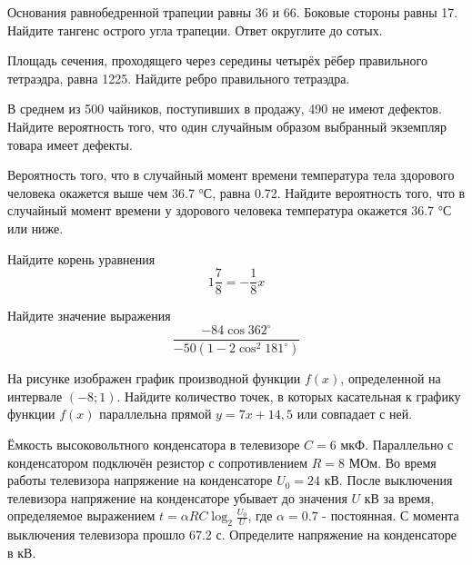 \documentclass[twocolumn]{article}
\begin{document}
\cleardoublepage
\def\examvart{Вариант 18.1}
\normalsize

\startpartone
\large




\begin{taskBN}{1}
Основания равнобедренной трапеции равны 36 и 66. Боковые стороны равны 17. Найдите тангенс острого угла трапеции. Ответ округлите до сотых.
\end{taskBN}

\begin{taskBN}{2}
Площадь сечения, проходящего через середины четырёх рёбер правильного тетраэдра, равна 1225. Найдите ребро правильного тетраэдра.
\end{taskBN}

\begin{taskBN}{3}
В среднем из 500 чайников, поступивших в продажу, 490 не имеют дефектов. Найдите вероятность того, что один случайным образом выбранный экземпляр товара имеет дефекты.
\end{taskBN}

\begin{taskBN}{4}
Вероятность того, что в случайный момент времени температура тела здорового человека окажется выше чем 36.7 °С, равна 0.72. Найдите вероятность того, что в случайный момент времени у здорового человека температура окажется 36.7 °С или ниже.
\end{taskBN}

\begin{taskBN}{5}
Найдите корень уравнения $${1}\frac{7}{8}=-\frac{1}{8}x$$
\end{taskBN}

\begin{taskBN}{6}
Найдите значение выражения $$\frac{-84\cos362^\circ}{-50(1-2\cos^2{181^\circ})}$$
\end{taskBN}

\begin{taskBN}{7}
На рисунке изображен график производной функции $f(x)$, определенной на интервале $(-8; 1)$. Найдите количество точек, в которых касательная к графику функции $f(x)$ параллельна прямой $y=7x+ 14{,}5 $ или совпадает с ней.\vspace{2.5cm}
\end{taskBN}

\begin{taskBN}{8}
Ёмкость высоковольтного конденсатора в телевизоре $C=6$ мкФ. Параллельно с конденсатором подключён резистор с сопротивлением $R=8$ МОм. Во время работы телевизора напряжение на конденсаторе $U_{0}=24$ кВ. После выключения телевизора напряжение на конденсаторе убывает до значения $U$ кВ за время, определяемое выражением $t=\alpha RC \log _{2} {\frac{U_{0}}{U}}$, где $ \alpha=0.7$ - постоянная. С момента выключения телевизора прошло 67.2 с. Определите напряжение на конденсаторе в кВ.
\end{taskBN}
\end{document}

